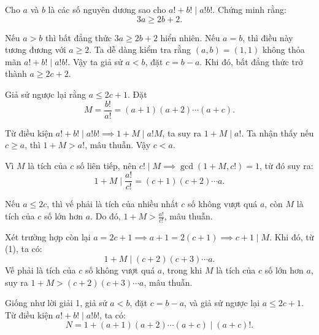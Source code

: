 \ifshowproblemandsoln
\ifshowproblem\begin{problem}\label{problem:IMO-2015-SL-P2}\fi
\ifshowsoln\begin{problem}\fi
    Cho \( a \) và \( b \) là các số nguyên dương sao cho \( a! + b! \mid a!b! \).  
    Chứng minh rằng:
    \[
        3a \ge 2b + 2.
    \]
\end{problem}
\fi

\ifshowsoln
\begin{soln}\footnotemark
    Nếu \( a > b \) thì bất đẳng thức \( 3a \ge 2b + 2 \) hiển nhiên. Nếu \( a = b \), thì điều này tương đương với \( a \ge 2 \).
    Ta dễ dàng kiểm tra rằng \( (a, b) = (1,1) \) không thỏa mãn \( a! + b! \mid a!b! \). Vậy ta giả sử \( a < b \), đặt \( c = b - a \).
    Khi đó, bất đẳng thức trở thành \( a \ge 2c + 2 \).

    Giả sử ngược lại rằng \( a \le 2c + 1 \). Đặt
    \[
        M = \frac{b!}{a!} = (a+1)(a+2)\cdots(a+c).
    \]

    Từ điều kiện \( a! + b! \mid a!b! \implies 1 + M \mid a!M \), ta suy ra \( 1 + M \mid a! \). Ta nhận thấy nếu \( c \ge a \), thì \( 1 + M > a! \), mâu thuẫn.
    Vậy \( c < a \).

    Vì \( M \) là tích của \( c \) số liên tiếp, nên \( c! \mid M \implies \gcd(1 + M, c!) = 1 \), từ đó suy ra:
    \[
        1 + M \mid \frac{a!}{c!} = (c+1)(c+2)\cdots a. \tag{1}
    \]

    Nếu \( a \le 2c \), thì vế phải là tích của nhiều nhất \( c \) số không vượt quá \( a \), còn \( M \) là tích của \( c \) số lớn hơn \( a \).
    Do đó, \( 1 + M > \frac{a!}{c!} \), mâu thuẫn.

    Xét trường hợp còn lại \( a = 2c + 1 \implies a + 1 = 2(c + 1) \implies c + 1 \mid M \). Khi đó, từ (1), ta có:
    \[
        1 + M \mid (c+2)(c+3)\cdots a.
    \]
    Vế phải là tích của \( c \) số không vượt quá \( a \), trong khi \( M \) là tích của \( c \) số lớn hơn \( a \),
    suy ra \( 1 + M > (c+2)(c+3)\cdots a \), mâu thuẫn.
\end{soln}

\begin{soln}
    Giống như lời giải 1, giả sử \( a < b \), đặt \( c = b - a \), và giả sử ngược lại \( a \le 2c + 1 \). Từ điều kiện \( a! + b! \mid a!b! \), ta có:
    \[
        N = 1 + (a+1)(a+2)\cdots(a+c) \mid (a+c)!.
    \]


\end{soln}
\end{problem}
